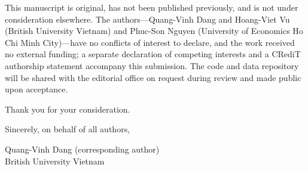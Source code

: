 \documentclass[11pt]{article}
\begin{document}
This manuscript is original, has not been published previously, and is
not under consideration elsewhere. The authors---Quang-Vinh Dang and
Hoang-Viet Vu (British University Vietnam) and Phuc-Son Nguyen (University of Economics Ho Chi Minh City)---have no conflicts of interest to
declare, and the work received no external funding; a separate
declaration of competing interests and a CRediT authorship statement
accompany this submission. The code and data repository will be shared
with the editorial office on request during review and made public
upon acceptance.

Thank you for your consideration.

\vspace{14pt}
\noindent Sincerely, on behalf of all authors,

\vspace{6pt}
\noindent Quang-Vinh Dang (corresponding author)\\
British University Vietnam
\end{document}
